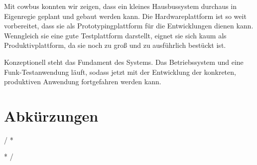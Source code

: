 \documentclass{IEEEtran}
\begin{document}
Mit cowbus konnten wir zeigen, dass ein kleines Hausbussystem durchaus in
Eigenregie geplant und gebaut werden kann.
Die Hardwareplattform ist so weit vorbereitet, dass sie als Prototypingplattform
für die Entwicklungen dienen kann.
Wenngleich sie eine gute Testplattform darstellt,
eignet sie sich kaum als Produktivplattform,
da sie noch zu groß und zu ausführlich bestückt ist.

Konzeptionell steht das Fundament des Systems.
Das Betriebssystem und eine Funk-Testanwendung läuft,
sodass jetzt mit der Entwicklung der konkreten,
produktiven Anwendung fortgefahren werden kann.





\section*{Abkürzungen}
\renewcommand{\IEEEiedlistdecl}{\IEEEsetlabelwidth{CSMA/CA}}
\begin{acronym}
\end{acronym}
\renewcommand{\IEEEiedlistdecl}{\relax}%


\comment / *
\listoffigures
\clearpage

\listoftables
\clearpage
* /



\end{document}
